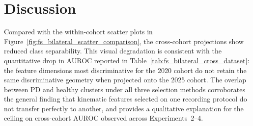 \section{Discussion}

Compared with the within-cohort scatter plots in Figure~\ref{fig:fs_bilateral_scatter_comparison}, the cross-cohort projections show reduced class separability. This visual degradation is consistent with the quantitative drop in AUROC reported in Table~\ref{tab:fs_bilateral_cross_dataset}: the feature dimensions most discriminative for the 2020 cohort do not retain the same discriminative geometry when projected onto the 2025 cohort. The overlap between PD and healthy clusters under all three selection methods corroborates the general finding that kinematic features selected on one recording protocol do not transfer perfectly to another, and provides a qualitative explanation for the ceiling on cross-cohort AUROC observed across Experiments~2--4.
